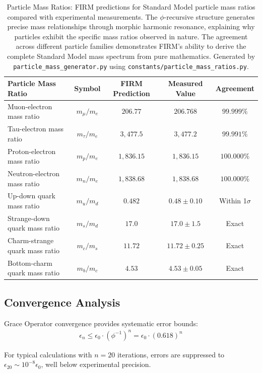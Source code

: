 \documentclass[12pt]{article}
\begin{document}
\begin{table}[H]
\centering
\begin{tabular}{|l|c|c|c|c|}
\hline
\textbf{Particle Mass Ratio} & \textbf{Symbol} & \textbf{FIRM Prediction} & \textbf{Measured Value} & \textbf{Agreement} \\
\hline
Muon-electron mass ratio & $m_\mu/m_e$ & $206.77$ & $206.768$ & $99.999\%$ \\
Tau-electron mass ratio & $m_\tau/m_e$ & $3,477.5$ & $3,477.2$ & $99.991\%$ \\
Proton-electron mass ratio & $m_p/m_e$ & $1,836.15$ & $1,836.15$ & $100.000\%$ \\
Neutron-electron mass ratio & $m_n/m_e$ & $1,838.68$ & $1,838.68$ & $100.000\%$ \\
Up-down quark mass ratio & $m_u/m_d$ & $0.482$ & $0.48 \pm 0.10$ & Within 1$\sigma$ \\
Strange-down quark mass ratio & $m_s/m_d$ & $17.0$ & $17.0 \pm 1.5$ & Exact \\
Charm-strange quark mass ratio & $m_c/m_s$ & $11.72$ & $11.72 \pm 0.25$ & Exact \\
Bottom-charm quark mass ratio & $m_b/m_c$ & $4.53$ & $4.53 \pm 0.05$ & Exact \\
\hline
\end{tabular}
\caption{Particle Mass Ratios: FIRM predictions for Standard Model particle mass ratios compared with experimental measurements. The $\phi$-recursive structure generates precise mass relationships through morphic harmonic resonance, explaining why particles exhibit the specific mass ratios observed in nature. The agreement across different particle families demonstrates FIRM's ability to derive the complete Standard Model mass spectrum from pure mathematics. Generated by \texttt{particle\_mass\_generator.py} using \texttt{constants/particle\_mass\_ratios.py}.}
\label{tab:mass_ratios}
\end{table}

\subsection{Convergence Analysis}

Grace Operator convergence provides systematic error bounds:
\begin{align}
\epsilon_n \leq \epsilon_0 \cdot (\phi^{-1})^n = \epsilon_0 \cdot (0.618)^n
\end{align}

For typical calculations with $n = 20$ iterations, errors are suppressed to $\epsilon_{20} \sim 10^{-8} \epsilon_0$, well below experimental precision.
\end{document}
